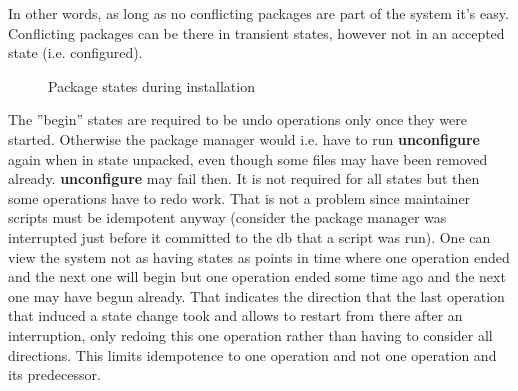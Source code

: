 \documentclass[a4paper]{scrartcl}
\newcommand{\program}[1]{\textbf{#1}}
\begin{document}
	In other words, as long as no conflicting packages are part of the system it's easy. Conflicting packages can be there in transient states, however not in an accepted state (i.e. configured).
	
	\begin{figure}[ht]
		\centering
		
		
		\caption{Package states during installation}
		\label{fig:package_states_install}
	\end{figure}

	The ''begin'' states are required to be undo operations only once they were started. Otherwise the package manager would i.e. have to run \program{unconfigure} again when in state unpacked, even though some files may have been removed already. \program{unconfigure} may fail then. It is not required for all states but then some operations have to redo work. That is not a problem since maintainer scripts must be idempotent anyway (consider the package manager was interrupted just before it committed to the db that a script was run). One can view the system not as having states as points in time where one operation ended and the next one will begin but one operation ended some time ago and the next one may have begun already. That indicates the direction that the last operation that induced a state change took and allows to restart from there after an interruption, only redoing this one operation rather than having to consider all directions. This limits idempotence to one operation and not one operation and its predecessor.
	
\end{document}
